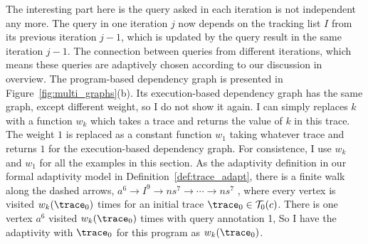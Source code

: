 \begin{example}
{The interesting part here is the query asked in each iteration is not independent any more. 
The query in one iteration $j$ now depends on the tracking list $I$ from its previous iteration $j-1$, which is updated by the query result in the same iteration $j-1$. The connection between queries from different iterations, 
 which means these queries are adaptively chosen according to our discussion in overview.
}
The program-based dependency graph is presented 
in Figure~\ref{fig:multi_graphs}(b). 
Its execution-based dependency graph has the same graph, except different weight, so I do not show it again. I can simply replaces $k$ with a function $w_k$ which takes a trace and returns the value of $k$ in this trace. The weight $1$ is replaced as a constant function $w_1$ taking whatever trace and returns $1$ for the execution-based dependency graph. For consistence, I use $w_k$ and $w_1$ for all the examples in this section.
As the adaptivity definition in our formal adaptivity model in Definition~\ref{def:trace_adapt},
there is a finite walk along the dashed arrows,
$a^{6} \to I^9 \to ns^{7} \to  \cdots \to ns^7$ , 
where every vertex is visited $w_k(\trace_0)$ times for an initial trace $\trace_0 \in \mathcal{T}_0(c)$.
There is one vertex $a^{6}$ visited $w_k(\trace_0)$ times with query annotation 1, 
So I have the adaptivity with $\trace_0$ for this program as $w_k(\trace_0)$.


\end{example}
